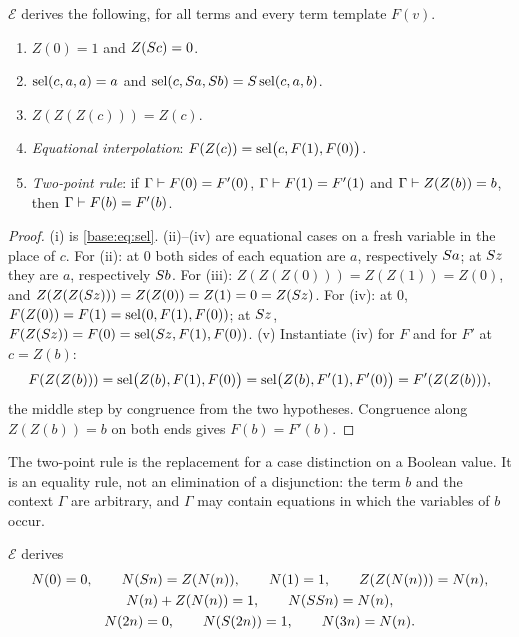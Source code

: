 \begin{lemma}
\label{base:lem:interp}
$\mathcal E$ derives the following, for all terms and every term template
$F(v)$.
\begin{enumerate}[label=\textup{(\roman*)}]
\item $Z(0)=1$ and $Z(S c)=0$.
\item $\operatorname{sel}(c,a,a)=a$ and $\operatorname{sel}(c,S a,S b)=S\operatorname{sel}(c,a,b)$.
\item $Z(Z(Z(c)))=Z(c)$.
\item \emph{Equational interpolation}:
 $F(Z(c))=\operatorname{sel}\bigl(c,F(1),F(0)\bigr)$.
\item \emph{Two-point rule}: if $\Gamma\vdash F(0)=F'(0)$,
 $\Gamma\vdash F(1)=F'(1)$ and $\Gamma\vdash Z(Z(b))=b$, then
 $\Gamma\vdash F(b)=F'(b)$.
\end{enumerate}
\end{lemma}

\begin{proof}
(i) is \eqref{base:eq:sel}.  (ii)--(iv) are equational cases on a fresh
variable in the place of $c$.  For (ii): at $0$ both sides of each equation
are $a$, respectively $S a$; at $S z$ they are $a$, respectively
$S b$.  For (iii): $Z(Z(Z(0)))=Z(Z(1))=Z(0)$, and
$Z(Z(Z(S z)))=Z(Z(0))=Z(1)=0=Z(S z)$.  For (iv): at $0$,
$F(Z(0))=F(1)=\operatorname{sel}(0,F(1),F(0))$; at $S z$,
$F(Z(S z))=F(0)=\operatorname{sel}(S z,F(1),F(0))$.
(v) Instantiate (iv) for $F$ and for $F'$ at $c=Z(b)$:
\[
 F(Z(Z(b)))=\operatorname{sel}\bigl(Z(b),F(1),F(0)\bigr)
           =\operatorname{sel}\bigl(Z(b),F'(1),F'(0)\bigr)=F'(Z(Z(b))),
\]
the middle step by congruence from the two hypotheses.  Congruence along
$Z(Z(b))=b$ on both ends gives $F(b)=F'(b)$.
\end{proof}

The two-point rule is the replacement for a case distinction on a Boolean
value.  It is an equality rule, not an elimination of a disjunction: the
term $b$ and the context $\Gamma$ are arbitrary, and $\Gamma$ may contain
equations in which the variables of $b$ occur.

\begin{lemma}[Parity]
\label{base:lem:parity}
$\mathcal E$ derives
\begin{gather*}
 N(0)=0,\qquad N(S n)=Z(N(n)),\qquad N(1)=1,\qquad Z(Z(N(n)))=N(n),\\
 N(n)+Z(N(n))=1,\qquad N(SS n)=N(n),\\
 N(2n)=0,\qquad N(S(2n))=1,\qquad N(3n)=N(n).
\end{gather*}
\end{lemma}

